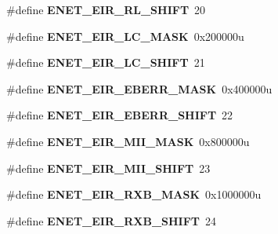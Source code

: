 \begin{DoxyCompactItemize}
\item 
\#define {\bfseries E\+N\+E\+T\+\_\+\+E\+I\+R\+\_\+\+R\+L\+\_\+\+S\+H\+I\+FT}~20\hypertarget{group__ENET__Register__Masks_gabcf1f78dde9d0ffc62f86c1098c3f1ff}{}\label{group__ENET__Register__Masks_gabcf1f78dde9d0ffc62f86c1098c3f1ff}

\item 
\#define {\bfseries E\+N\+E\+T\+\_\+\+E\+I\+R\+\_\+\+L\+C\+\_\+\+M\+A\+SK}~0x200000u\hypertarget{group__ENET__Register__Masks_gacdf52f6f451888ba1f10482ecc54c5ae}{}\label{group__ENET__Register__Masks_gacdf52f6f451888ba1f10482ecc54c5ae}

\item 
\#define {\bfseries E\+N\+E\+T\+\_\+\+E\+I\+R\+\_\+\+L\+C\+\_\+\+S\+H\+I\+FT}~21\hypertarget{group__ENET__Register__Masks_gac5df6240f71313895d446771dfbeec69}{}\label{group__ENET__Register__Masks_gac5df6240f71313895d446771dfbeec69}

\item 
\#define {\bfseries E\+N\+E\+T\+\_\+\+E\+I\+R\+\_\+\+E\+B\+E\+R\+R\+\_\+\+M\+A\+SK}~0x400000u\hypertarget{group__ENET__Register__Masks_ga3f96770a7d989e647572c6dfb8c512fc}{}\label{group__ENET__Register__Masks_ga3f96770a7d989e647572c6dfb8c512fc}

\item 
\#define {\bfseries E\+N\+E\+T\+\_\+\+E\+I\+R\+\_\+\+E\+B\+E\+R\+R\+\_\+\+S\+H\+I\+FT}~22\hypertarget{group__ENET__Register__Masks_gab32cc5037fa08d0be050eaa706ac2822}{}\label{group__ENET__Register__Masks_gab32cc5037fa08d0be050eaa706ac2822}

\item 
\#define {\bfseries E\+N\+E\+T\+\_\+\+E\+I\+R\+\_\+\+M\+I\+I\+\_\+\+M\+A\+SK}~0x800000u\hypertarget{group__ENET__Register__Masks_gaa7950e8d1394fd92eb09a2ce4623ab83}{}\label{group__ENET__Register__Masks_gaa7950e8d1394fd92eb09a2ce4623ab83}

\item 
\#define {\bfseries E\+N\+E\+T\+\_\+\+E\+I\+R\+\_\+\+M\+I\+I\+\_\+\+S\+H\+I\+FT}~23\hypertarget{group__ENET__Register__Masks_gad724bdc9149fc578f9c331bdfcef004f}{}\label{group__ENET__Register__Masks_gad724bdc9149fc578f9c331bdfcef004f}

\item 
\#define {\bfseries E\+N\+E\+T\+\_\+\+E\+I\+R\+\_\+\+R\+X\+B\+\_\+\+M\+A\+SK}~0x1000000u\hypertarget{group__ENET__Register__Masks_gaf8eb82815708cb73c87988dea057aa19}{}\label{group__ENET__Register__Masks_gaf8eb82815708cb73c87988dea057aa19}

\item 
\#define {\bfseries E\+N\+E\+T\+\_\+\+E\+I\+R\+\_\+\+R\+X\+B\+\_\+\+S\+H\+I\+FT}~24\hypertarget{group__ENET__Register__Masks_gad60f05312b15d4abba4d24862c5acbcd}{}\label{group__ENET__Register__Masks_gad60f05312b15d4abba4d24862c5acbcd}


\end{DoxyCompactItemize}
